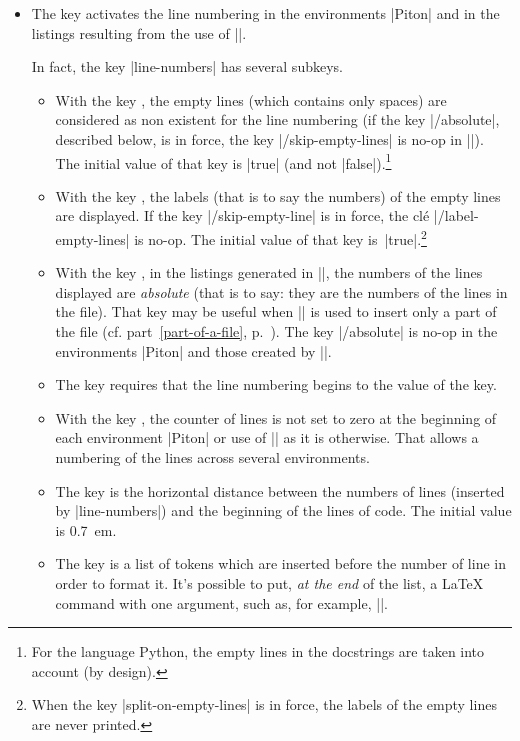 \documentclass{article}
\begin{document}
\begin{itemize}
\item {} The key  activates the
line numbering in the environments |{Piton}| and in the listings resulting
from the use of |\PitonInputFile|.

In fact, the key |line-numbers| has several subkeys.
\begin{itemize}
\item With the key , the empty lines
(which contains only spaces) are considered as non existent for the line
numbering (if the key |/absolute|, described below, is in force, the key
|/skip-empty-lines| is no-op in |\PitonInputFile|). The initial value of that
key is |true| (and not |false|).\footnote{For the language Python, the empty
lines in the docstrings are taken into account (by design).}
\item With the key , the labels
(that is to say the numbers) of the empty lines are displayed. If the key
|/skip-empty-line| is in force, the clé |/label-empty-lines| is no-op. The
initial value of that key is~|true|.\footnote{When the key
|split-on-empty-lines| is in force, the labels of the empty lines are never printed.}
\item With the key , in the listings
generated in |\PitonInputFile|, the numbers of the lines displayed are
\emph{absolute} (that is to say: they are the numbers of the lines in the
file). That key may be useful when |\PitonInputFile| is used to insert only a
part of the file (cf. part~\ref{part-of-a-file}, p.~\pageref{part-of-a-file}).
The key |/absolute| is no-op in the environments |{Piton}| and those created
by |\NewPitonEnvironment|.
\item The key  requires that the line numbering
begins to the value of the key. 
\item With the key , the counter of lines is
not set to zero at the beginning of each environment |{Piton}| or use of
|\PitonInputFile| as it is otherwise. That allows a numbering of the lines
across several environments.
\item The key  is the horizontal distance between
the numbers of lines (inserted by |line-numbers|) and the beginning of the
lines of code. The initial value is 0.7~em.
\item The key  is a list of tokens which are inserted before
the number of line in order to format it. It's possible to put, \emph{at the
end} of the list, a LaTeX command with one argument, such as, for example,
|\fbox|. 


\end{itemize}
\end{itemize}
\end{document}
